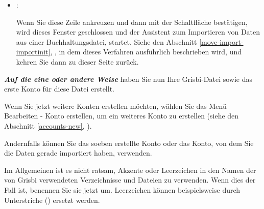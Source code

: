 \begin{enumerate}
\begin{itemize}
		\item[\textopenbullet] :\par%
		Wenn Sie diese Zeile ankreuzen und dann mit der Schaltfläche  bestätigen, wird dieses Fenster geschlossen und der  Assistent zum Importieren von Daten aus einer Buchhaltungsdatei, startet. Siehe den Abschnitt \vref{move-import-importinit}, , in dem dieses Verfahren ausführlich beschrieben wird, und kehren Sie dann zu dieser Seite zurück.%
	\end{itemize}
\end{enumerate}

\label{start-newfile-end}

\textit{\textbf{Auf die eine oder andere Weise}} haben Sie nun Ihre Grisbi-Datei sowie das erste Konto für diese Datei erstellt.%


Wenn Sie jetzt weitere Konten erstellen möchten, wählen Sie das Menü {Bearbeiten - Konto erstellen}, um ein weiteres Konto zu erstellen (siehe den Abschnitt \vref{accounts-new}, ).%


Andernfalls können Sie das soeben erstellte Konto oder das Konto, von dem Sie die Daten gerade importiert haben, verwenden.%

Im Allgemeinen ist es nicht ratsam, Akzente oder Leerzeichen in den Namen der von Grisbi verwendeten Verzeichnisse und Dateien zu verwenden. Wenn dies der Fall ist, benennen Sie sie jetzt um. Leerzeichen können beispielsweise durch Unterstriche (\underline{}) ersetzt werden.%

